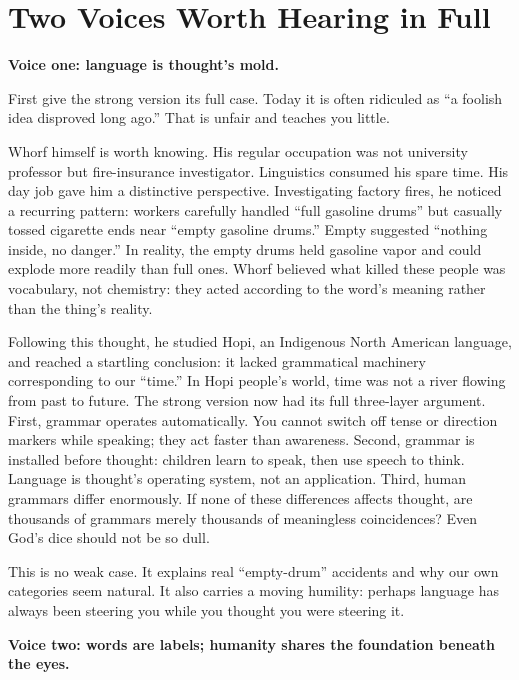 \section{Two Voices Worth Hearing in Full}
\textbf{Voice one: language is thought's mold.}

First give the strong version its full case. Today it is often ridiculed as ``a foolish idea disproved long ago.'' That is unfair and teaches you little.

Whorf himself is worth knowing. His regular occupation was not university professor but fire-insurance investigator. Linguistics consumed his spare time. His day job gave him a distinctive perspective. Investigating factory fires, he noticed a recurring pattern: workers carefully handled ``full gasoline drums'' but casually tossed cigarette ends near ``empty gasoline drums.'' Empty suggested ``nothing inside, no danger.'' In reality, the empty drums held gasoline vapor and could explode more readily than full ones. Whorf believed what killed these people was vocabulary, not chemistry: they acted according to the word's meaning rather than the thing's reality.

Following this thought, he studied Hopi, an Indigenous North American language, and reached a startling conclusion: it lacked grammatical machinery corresponding to our ``time.'' In Hopi people's world, time was not a river flowing from past to future. The strong version now had its full three-layer argument. First, grammar operates automatically. You cannot switch off tense or direction markers while speaking; they act faster than awareness. Second, grammar is installed before thought: children learn to speak, then use speech to think. Language is thought's operating system, not an application. Third, human grammars differ enormously. If none of these differences affects thought, are thousands of grammars merely thousands of meaningless coincidences? Even God's dice should not be so dull.

This is no weak case. It explains real ``empty-drum'' accidents and why our own categories seem natural. It also carries a moving humility: perhaps language has always been steering you while you thought you were steering it.

\textbf{Voice two: words are labels; humanity shares the foundation beneath the eyes.}

